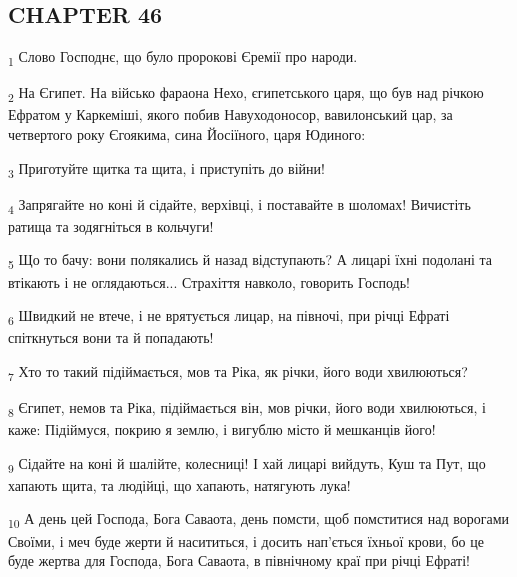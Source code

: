 \subsection{CHAPTER 46}
\begin{tcolorbox}
\textsubscript{1} Слово Господнє, що було пророкові Єремії про народи.
\end{tcolorbox}
\begin{tcolorbox}
\textsubscript{2} На Єгипет. На військо фараона Нехо, єгипетського царя, що був над річкою Ефратом у Каркеміші, якого побив Навуходоносор, вавилонський цар, за четвертого року Єгоякима, сина Йосіїного, царя Юдиного:
\end{tcolorbox}
\begin{tcolorbox}
\textsubscript{3} Приготуйте щитка та щита, і приступіть до війни!
\end{tcolorbox}
\begin{tcolorbox}
\textsubscript{4} Запрягайте но коні й сідайте, верхівці, і поставайте в шоломах! Вичистіть ратища та зодягніться в кольчуги!
\end{tcolorbox}
\begin{tcolorbox}
\textsubscript{5} Що то бачу: вони полякались й назад відступають? А лицарі їхні подолані та втікають і не оглядаються... Страхіття навколо, говорить Господь!
\end{tcolorbox}
\begin{tcolorbox}
\textsubscript{6} Швидкий не втече, і не врятується лицар, на півночі, при річці Ефраті спіткнуться вони та й попадають!
\end{tcolorbox}
\begin{tcolorbox}
\textsubscript{7} Хто то такий підіймається, мов та Ріка, як річки, його води хвилюються?
\end{tcolorbox}
\begin{tcolorbox}
\textsubscript{8} Єгипет, немов та Ріка, підіймається він, мов річки, його води хвилюються, і каже: Підіймуся, покрию я землю, і вигублю місто й мешканців його!
\end{tcolorbox}
\begin{tcolorbox}
\textsubscript{9} Сідайте на коні й шалійте, колесниці! І хай лицарі вийдуть, Куш та Пут, що хапають щита, та людійці, що хапають, натягують лука!
\end{tcolorbox}
\begin{tcolorbox}
\textsubscript{10} А день цей Господа, Бога Саваота, день помсти, щоб помститися над ворогами Своїми, і меч буде жерти й насититься, і досить нап'ється їхньої крови, бо це буде жертва для Господа, Бога Саваота, в північному краї при річці Ефраті!
\end{tcolorbox}
